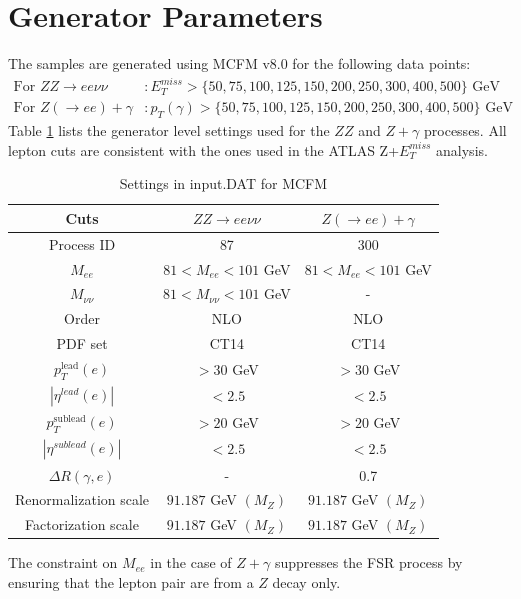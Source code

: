 \documentclass[11pt,a4paper,final]{report}
\begin{document}
\section{Generator Parameters}
The samples are generated using MCFM v8.0 for the following data points:
\begin{align*}
	\text{For } ZZ \rightarrow ee\nu\nu &: E_T^{miss} > \{50,75,100,125,150,200,250,300,400,500\}\text{ GeV} \\
	\text{For } Z(\rightarrow ee)+\gamma &: p_T(\gamma) > \{50,75,100,125,150,200,250,300,400,500\}\text{ GeV}
\end{align*}
Table \ref{table:default} lists the generator level settings used for the $ZZ$ and $Z+\gamma$ processes. All lepton cuts are consistent with the ones used in the ATLAS Z+$E_T^{miss}$ analysis.
\begin{table}[H]
\begin{center}
	\begin{tabular}{|c|c|c|}
	\hline
	\textbf{Cuts} &$ZZ \rightarrow ee\nu\nu$ & $Z(\rightarrow ee)+\gamma$\\
	\hline
	Process ID & 87 & 300\\
	$M_{ee}$ & $81 < M_{ee} < 101$ GeV & $81 < M_{ee} < 101$ GeV\\
	$M_{\nu\nu}$ & $81 < M_{\nu\nu} < 101$ GeV& -\\
	Order & NLO & NLO\\
	PDF set & CT14 & CT14\\
	$p_T^{\text{lead}}(e)$ & $> 30$ GeV & $> 30$ GeV\\
	$|\eta^{lead}(e)|$ & $< 2.5$ & $< 2.5$\\
	$p_T^{\text{sublead}}(e)$ & $> 20$ GeV & $> 20$ GeV\\
	$|\eta^{sublead}(e)|$ & $< 2.5$ & $< 2.5$\\
	$\Delta R(\gamma,e)$ & - & 0.7\\
	Renormalization scale & $91.187$ GeV $(M_{Z})$& $91.187$ GeV $(M_{Z})$\\
	Factorization scale & $91.187$ GeV $(M_{Z})$& $91.187$ GeV $(M_{Z})$\\
	\hline
	\end{tabular}
	\caption{Settings in input.DAT for MCFM}
	\label{table:default}
	\end{center}
\end{table}
The constraint on $M_{ee}$ in the case of $Z+\gamma$ suppresses the FSR process by ensuring that the lepton pair are from a $Z$ decay only.
\end{document}
